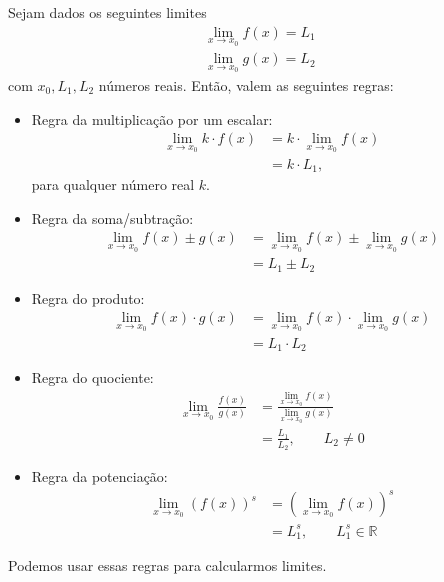 Sejam dados os seguintes limites
\begin{gather}
  \lim_{x\to x_0} f(x) = L_1\\
  \lim_{x\to x_0} g(x) = L_2
\end{gather}
com $x_0, L_1, L_2$ números reais. Então, valem as seguintes regras:
\begin{itemize}
\item Regra da multiplicação por um escalar:
  \begin{align}
    \lim_{x\to x_0} k\cdot f(x) &= k\cdot \lim_{x\to x_0} f(x)\\
                          &= k\cdot L_1,
  \end{align}
  para qualquer número real $k$.
\item Regra da soma/subtração:
  \begin{align}
    \lim_{x\to x_0} f(x) \pm g(x) &= \lim_{x\to x_0} f(x) \pm \lim_{x\to x_0} g(x) \\
                                  &= L_1 \pm L_2
  \end{align}
\item Regra do produto:
  \begin{align}
    \lim_{x\to x_0} f(x) \cdot g(x) &= \lim_{x\to x_0} f(x) \cdot \lim_{x\to x_0} g(x) \\
                                    &= L_1 \cdot L_2
  \end{align}
\item Regra do quociente:
  \begin{align}
    \lim_{x\to x_0} \frac{f(x)}{g(x)} &= \frac{\lim_{x\to x_0} f(x)}{\lim_{x\to x_0} g(x)} \\
    &= \frac{L_1}{L_2},\qquad L_2\neq 0
  \end{align}
\item Regra da potenciação:
  \begin{align}
    \lim_{x\to x_0} (f(x))^s &= \left(\lim_{x\to x_0} f(x)\right)^s\\
    &= L_1^s,\qquad L_1^s\in\mathbb{R}
  \end{align}
\end{itemize}

Podemos usar essas regras para calcularmos limites.


